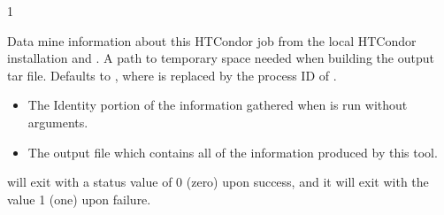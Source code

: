 \begin{ManPage}{\label{man-condor-gather-info}}{1}
\begin{Options}
  {Data mine information about this HTCondor job from the local 
  HTCondor installation and .}
  {A path to temporary space needed when building the output tar file.
  Defaults to , where  is replaced by
  the process ID of .}
\end{Options}

\Files

\begin{itemize}
  \item{} The Identity portion of the information 
  gathered when  is run without arguments.

  \item{} The output file which contains all of 
  the information produced by this tool.
\end{itemize}

\ExitStatus

 will exit with a status value of 0 (zero) upon success,
and it will exit with the value 1 (one) upon failure.

\end{ManPage}
